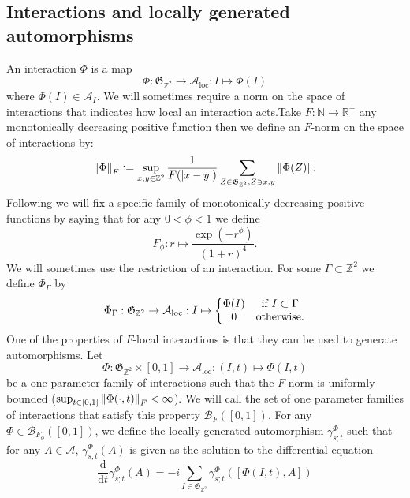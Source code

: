 \documentclass[12pt,a4paper,twoside]{article}
\renewcommand{\d}{\text{d}}
\newcommand{\defeq}{\vcentcolon=}
\let\originalleft\left
\let\originalright\right
\renewcommand{\left}{\mathopen{}\mathclose\bgroup\originalleft}
\renewcommand{\right}{\aftergroup\egroup\originalright}
\newcommand{\BB}{\mathcal B}
\newcommand{\ZZ}{\mathbb Z}
\renewcommand{\AA}{\mathcal A}
\newcommand{\RR}{\mathbb R}
\newcommand{\NN}{\mathbb{N}}
\theoremstyle{definition}
\numberwithin{equation}{section}
\begin{document}
\subsection{Interactions and locally generated automorphisms}\label{sec:Interactions}
An interaction $\Phi$ is a map
\begin{equation}
	\Phi: \mathfrak{G}_{\ZZ^2}\rightarrow \AA_{\text{loc}}: I \mapsto \Phi(I)
\end{equation}
where $\Phi(I)\in\AA_I$. We will sometimes require a norm on the space of interactions that indicates how local an interaction acts.Take $F:\NN\rightarrow \RR^+$ any monotonically decreasing positive function then we define an $F$-norm on the space of interactions by:
\begin{equation}
	\norm{\Phi}_F\defeq \sup_{x,y\in\ZZ^2}\frac{1}{F(\abs{x-y})}\sum_{Z\in\mathfrak{G}_{\ZZ^2},Z\ni x,y}\norm{\Phi(Z)}.
\end{equation}
Following \cite{ogata2021h3gmathbb} we will fix a specific family of monotonically decreasing positive functions by saying that for any $0<\phi<1$ we define
\begin{equation}
	F_\phi:r\mapsto \frac{\exp(-r^\phi)}{(1+r)^4}.
\end{equation}
We will sometimes use the restriction of an interaction. For some $\Gamma\subset\ZZ^2$ we define $\Phi_\Gamma$ by
\begin{equation}
	\Phi_\Gamma:\mathfrak{G}_{\ZZ^2}\rightarrow \AA_{\text{loc}}:I\mapsto\left\{\begin{matrix}
		\Phi(I)&\text{if }I\subset\Gamma\\0&\text{otherwise}.
	\end{matrix}\right.
\end{equation}
One of the properties of $F$-local interactions is that they can be used to generate automorphisms. Let
\begin{equation}
	\Phi:\mathfrak{G}_{\ZZ^2}\times [0,1]\rightarrow \AA_{\text{loc}}:(I,t)\mapsto \Phi(I,t)
\end{equation}
be a one parameter family of interactions such that the $F$-norm is uniformly bounded ($\sup_{t\in[0,1]}\norm{\Phi(\cdot,t)}_F<\infty$). We will call the set of one parameter families of interactions that satisfy this property $\BB_{F}([0,1])$. For any $\Phi\in\BB_{F_\phi}([0,1])$, we define the locally generated automorphism $\gamma^{\Phi}_{s;t}$ such that for any $A\in\AA$, $\gamma^{\Phi}_{s;t}(A)$ is given as the solution to the differential equation
\begin{equation}
	\frac{\d}{\d t}\gamma^{\Phi}_{s;t}(A)=-i\sum_{I\in\mathfrak{G}_{\ZZ^2}}\gamma^{\Phi}_{s;t}([\Phi(I,t),A])
\end{equation}
\end{document}
